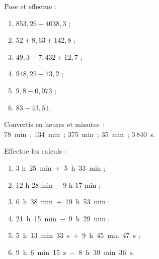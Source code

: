 \begin{exercice}
Pose et effectue :
\begin{enumerate} 
 \item $853,26 + 4 038,3$ ;
 \item $52 + 8,63 + 142,8$ ;
 \item $49,3 + 7,432 + 12,7$ ;
 \item $948,25 - 73,2$ ;
 \item $9,8 - 0,073$ ;
 \item $83 - 43,51$.
 \end{enumerate} 
 \end{exercice}


\begin{exercice}
Convertis en heures et minutes :\\
78 min ; 134 min ; 375 min ; 35 min ; 3\,840 s.
\end{exercice}


\begin{exercice}
Effectue les calculs :
\begin{enumerate} 
 \item 3 h 25 min $+$ 5 h 33 min ;
 \item 12 h 28 min $-$ 9 h 17 min ;
 \item 6 h 38 min $+$ 19 h 53 min ;
 \item 21 h 15 min $-$ 9 h 29 min ;
 \item 5 h 13 min 33 s $+$ 9 h 45 min 47 s ;
 \item 9 h 6 min 15 s $-$ 8 h 39 min 36 s.
 \end{enumerate}
\end{exercice}


